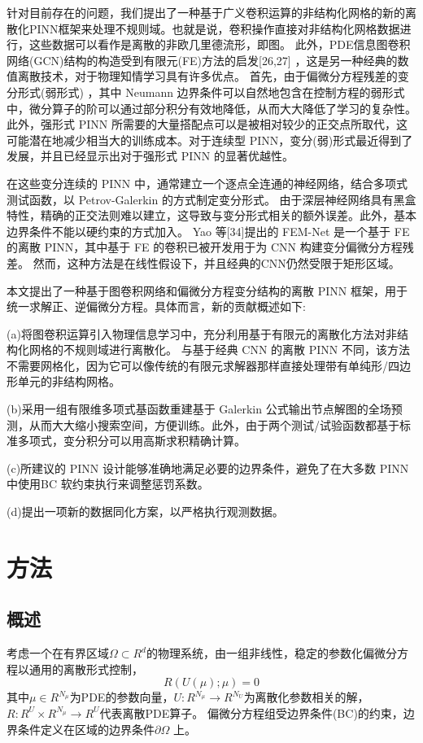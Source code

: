 针对目前存在的问题，我们提出了一种基于广义卷积运算的非结构化网格的新的离散化PINN框架来处理不规则域。也就是说，卷积操作直接对非结构化网格数据进行，这些数据可以看作是离散的非欧几里德流形，即图。
此外，PDE信息图卷积网络(GCN)结构的构造受到有限元(FE)方法的启发[26,27] ，这是另一种经典的数值离散技术，对于物理知情学习具有许多优点。
首先，由于偏微分方程残差的变分形式(弱形式) ，其中 Neumann 边界条件可以自然地包含在控制方程的弱形式中，微分算子的阶可以通过部分积分有效地降低，从而大大降低了学习的复杂性。
此外，强形式 PINN 所需要的大量搭配点可以是被相对较少的正交点所取代，这可能潜在地减少相当大的训练成本。对于连续型 PINN，变分(弱)形式最近得到了发展，并且已经显示出对于强形式 PINN 的显著优越性。

在这些变分连续的 PINN 中，通常建立一个逐点全连通的神经网络，结合多项式测试函数，以 Petrov-Galerkin 的方式制定变分形式。
由于深层神经网络具有黑盒特性，精确的正交法则难以建立，这导致与变分形式相关的额外误差。此外，基本边界条件不能以硬约束的方式加入。
Yao 等[34]提出的 FEM-Net 是一个基于 FE 的离散 PINN，其中基于 FE 的卷积已被开发用于为 CNN 构建变分偏微分方程残差。
然而，这种方法是在线性假设下，并且经典的CNN仍然受限于矩形区域。

本文提出了一种基于图卷积网络和偏微分方程变分结构的离散 PINN 框架，用于统一求解正、逆偏微分方程。具体而言，新的贡献概述如下:

(a)将图卷积运算引入物理信息学习中，充分利用基于有限元的离散化方法对非结构化网格的不规则域进行离散化。
与基于经典 CNN 的离散 PINN 不同，该方法不需要网格化，因为它可以像传统的有限元求解器那样直接处理带有单纯形/四边形单元的非结构网格。

(b)采用一组有限维多项式基函数重建基于 Galerkin 公式输出节点解图的全场预测，从而大大缩小搜索空间，方便训练。此外，由于两个测试/试验函数都基于标准多项式，变分积分可以用高斯求积精确计算。

(c)所建议的 PINN 设计能够准确地满足必要的边界条件，避免了在大多数 PINN 中使用BC 软约束执行来调整惩罚系数。

(d)提出一项新的数据同化方案，以严格执行观测数据。

\section{方法}
\subsection{概述}
考虑一个在有界区域$\Omega\subset R^d$的物理系统，由一组非线性，稳定的参数化偏微分方程以通用的离散形式控制，
$$R(U(\mu);\mu)=0$$
其中$\mu\in R^{N_\mu}$为PDE的参数向量，$U:R^{N_\mu}\rightarrow R^{N_U}$为离散化参数相关的解，$R:R^{U}\times R^{N_\mu}\rightarrow R^{U}$代表离散PDE算子。
偏微分方程组受边界条件(BC)的约束，边界条件定义在区域的边界条件$\partial \Omega$ 上。

